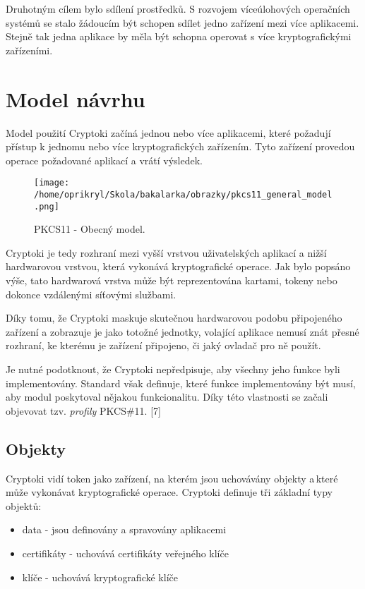 \documentclass[]{fithesis3}
\begin{document}
	Druhotným cílem bylo sdílení prostředků. S rozvojem víceúlohových operačních systémů se 		stalo žádoucím být schopen sdílet jedno zařízení mezi více aplikacemi. Stejně tak jedna 			aplikace by měla být schopna operovat s více kryptografickými zařízeními.

	\section{Model návrhu}

	Model použití Cryptoki začíná jednou nebo více aplikacemi, které požadují přístup k jednomu 		nebo více kryptografických zařízením. Tyto zařízení provedou operace požadované aplikací a 		vrátí výsledek.
	\begin{figure}[!ht]
  		\begin{minipage}{1.00\textwidth}
    			\texttt{[image: /home/oprikryl/Skola/bakalarka/obrazky/pkcs11\_general\_model.png]}
  		\end{minipage}
 		\caption{PKCS11 - Obecný model.}
  		\label{fig:PKCS11 - Obecný model.}
	\end{figure}

	Cryptoki je tedy rozhraní mezi vyšší vrstvou uživatelských aplikací a nižší hardwarovou 			vrstvou, která vykonává kryptografické operace. Jak bylo popsáno výše, tato hardwarová 			vrstva může být reprezentována kartami, tokeny nebo dokonce vzdálenými síťovými službami.

	Díky tomu, že Cryptoki maskuje skutečnou hardwarovou podobu připojeného zařízení a 			zobrazuje je jako totožné jednotky, volající aplikace nemusí znát přesné rozhraní, ke kterému je 		zařízení připojeno, či jaký ovladač pro ně použít.

	Je nutné podotknout, že Cryptoki nepředpisuje, aby všechny jeho funkce byli implementovány. 		Standard však definuje, které funkce implementovány být musí, aby modul poskytoval nějakou 		funkcionalitu. Díky této vlastnosti se začali objevovat tzv. \textit{profily} PKCS\#11. [7]

		\subsection{Objekty}

		Cryptoki vidí token jako zařízení, na kterém jsou uchovávány objekty a\,které může vykonávat 			kryptografické operace. Cryptoki definuje tři základní typy objektů:
		\begin{itemize}
			\item data - jsou definovány a spravovány aplikacemi
			\item certifikáty - uchovává certifikáty veřejného klíče
			\item klíče - uchovává kryptografické klíče
		\end{itemize}
\end{document}
